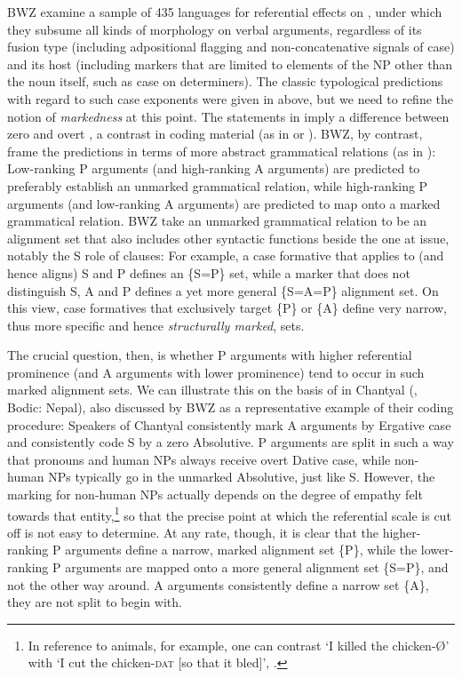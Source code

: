 \documentclass[output=paper]{langscibook}
\begin{document}
BWZ examine a sample of 435 languages for referential effects on , under which they subsume all kinds of morphology on verbal arguments, regardless of its fusion type (\ie including adpositional flagging and non-concatenative signals of case) and its host (\ie including markers that are limited to elements of the NP other than the noun itself, such as case on  determiners). The classic typological predictions with regard to such case exponents were given in  above, but we need to refine the notion of \textit{markedness} at this point. The statements in  imply a difference between zero and overt , \ie a contrast in coding material (as in \citealt{Comrie1981Language} or \citealt{Croft2003Typology}). BWZ, by contrast, frame the predictions in terms of more abstract grammatical relations (as in \citealt{Silverstein1976Hierarchy}): Low-ranking P arguments (and high-ranking A arguments) are predicted to preferably establish an unmarked grammatical relation, while high-ranking P arguments (and low-ranking A arguments) are predicted to map onto a marked grammatical relation. BWZ take an unmarked grammatical relation to be an alignment set that also includes other syntactic functions beside the one at issue, notably the S role of  clauses: For example, a case formative that applies to (and hence aligns) S and P defines an \{S=P\} set, while a marker that does not distinguish S, A and P defines a yet more general \{S=A=P\} alignment set. On this view, case formatives that exclusively target \{P\} or \{A\} define very narrow, thus more specific and hence \textit{structurally marked}, sets. 

The crucial question, then, is whether P arguments with higher referential prominence (and A arguments with lower prominence) tend to occur in such marked alignment sets. We can illustrate this on the basis of  in Chantyal (, Bodic: Nepal), also discussed by BWZ as a representative example of their coding procedure: Speakers of Chantyal consistently mark A arguments by Ergative case and consistently code S by a zero Absolutive. P arguments are split in such a way that pronouns and human NPs always receive overt Dative case, while non-human NPs typically go in the unmarked Absolutive, just like S. However, the marking for non-human NPs actually depends on the degree of empathy felt towards that entity,\footnote{In reference to animals, for example, one can contrast ‘I killed the chicken-Ø’ with ‘I cut the chicken-\textsc{dat} [so that it bled]’, \cf \citet{Noonan2003Chantyal}.} so that the precise point at which the referential scale is cut off is not easy to determine. At any rate, though, it is clear that the higher-ranking P arguments define a narrow, marked alignment set \{P\}, while the lower-ranking P arguments are mapped onto a more general alignment set \{S=P\}, and not the other way around. A arguments consistently define a narrow set \{A\}, \ie they are not split to begin with.
\end{document}
